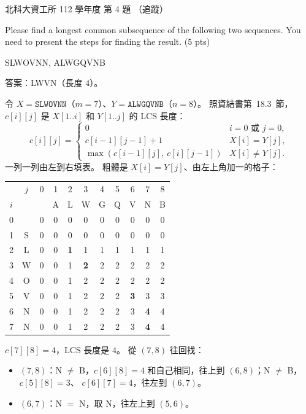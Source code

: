 \begin{pastexam}[label={px:ntut-112-ci-04}]{北科大資工所 112 學年度 第 4 題}
（追蹤）

Please find a longest common subsequence of the following two sequences. You need to present the steps for finding the result. (5 pts)
\begin{center}SLWOVNN, ALWGQVNB\end{center}
\end{pastexam}

\begin{pastsoln}
答案：LWVN（長度 $4$）。

令 $X = \texttt{SLWOVNN}$（$m = 7$）、$Y = \texttt{ALWGQVNB}$（$n = 8$）。 照資結書第~18.3~節，
$c[i][j]$ 是 $X[1..i]$ 和 $Y[1..j]$ 的 LCS 長度：
\[
c[i][j] =
\begin{cases}
0 & i = 0 \text{ 或 } j = 0,\\
c[i-1][j-1] + 1 & X[i] = Y[j],\\
\max(c[i-1][j],\ c[i][j-1]) & X[i] \ne Y[j].
\end{cases}
\]
一列一列由左到右填表。 粗體是 $X[i] = Y[j]$、由左上角加一的格子：
\begin{center}
\small
\begin{tabular}{cc|ccccccccc}
 & $j$ & 0 & 1 & 2 & 3 & 4 & 5 & 6 & 7 & 8 \\
$i$ & & & A & L & W & G & Q & V & N & B \\ \hline
0 & & 0 & 0 & 0 & 0 & 0 & 0 & 0 & 0 & 0 \\
1 & S & 0 & 0 & 0 & 0 & 0 & 0 & 0 & 0 & 0 \\
2 & L & 0 & 0 & \textbf{1} & 1 & 1 & 1 & 1 & 1 & 1 \\
3 & W & 0 & 0 & 1 & \textbf{2} & 2 & 2 & 2 & 2 & 2 \\
4 & O & 0 & 0 & 1 & 2 & 2 & 2 & 2 & 2 & 2 \\
5 & V & 0 & 0 & 1 & 2 & 2 & 2 & \textbf{3} & 3 & 3 \\
6 & N & 0 & 0 & 1 & 2 & 2 & 2 & 3 & \textbf{4} & 4 \\
7 & N & 0 & 0 & 1 & 2 & 2 & 2 & 3 & \textbf{4} & 4 \\
\end{tabular}
\end{center}
$c[7][8] = 4$，LCS 長度是 $4$。 從 $(7, 8)$ 往回找：
\begin{itemize}
\item $(7, 8)$：N $\ne$ B，$c[6][8] = 4$ 和自己相同，往上到 $(6, 8)$；N $\ne$ B，$c[5][8] = 3$、
$c[6][7] = 4$，往左到 $(6, 7)$。
\item $(6, 7)$：N $=$ N，取 N，往左上到 $(5, 6)$。

\end{itemize}
\end{pastsoln}
